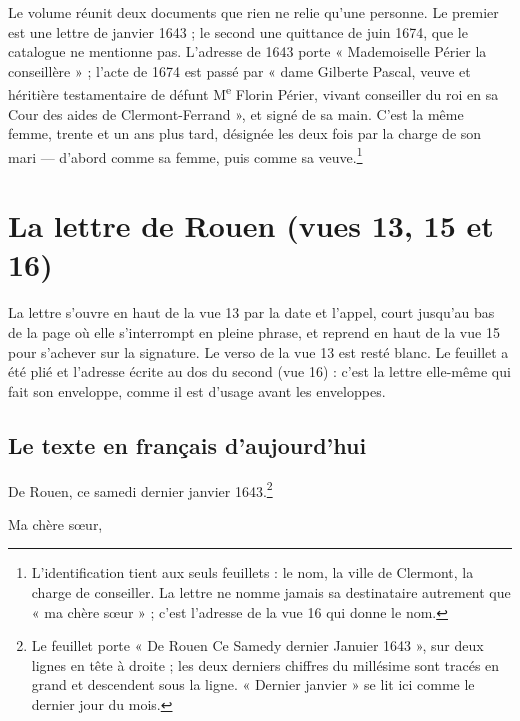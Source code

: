 \documentclass[11pt,a4paper]{article}
\begin{document}
Le volume réunit deux documents que rien ne relie qu'une personne. Le premier
est une lettre de janvier 1643 ; le second une quittance de juin 1674, que le
catalogue ne mentionne pas. L'adresse de 1643 porte « Mademoiselle Périer la
conseillère » ; l'acte de 1674 est passé par « dame Gilberte Pascal, veuve et
héritière testamentaire de défunt M\textsuperscript{e} Florin Périer, vivant
conseiller du roi en sa Cour des aides de Clermont-Ferrand », et signé de sa
main. C'est la même femme, trente et un ans plus tard, désignée les deux fois
par la charge de son mari — d'abord comme sa femme, puis comme sa
veuve.\footnote{L'identification tient aux seuls feuillets : le nom, la ville
de Clermont, la charge de conseiller. La lettre ne nomme jamais sa
destinataire autrement que « ma chère sœur » ; c'est l'adresse de la vue 16
qui donne le nom.}

\section*{La lettre de Rouen (vues 13, 15 et 16)}

La lettre s'ouvre en haut de la vue 13 par la date et l'appel, court jusqu'au
bas de la page où elle s'interrompt en pleine phrase, et reprend en haut de la
vue 15 pour s'achever sur la signature. Le verso de la vue 13 est resté blanc.
Le feuillet a été plié et l'adresse écrite au dos du second (vue 16) : c'est
la lettre elle-même qui fait son enveloppe, comme il est d'usage avant les
enveloppes.

\subsection*{Le texte en français d'aujourd'hui}

De Rouen, ce samedi dernier janvier 1643.\footnote{Le feuillet porte « De
Rouen Ce Samedy dernier Januier 1643 », sur deux lignes en tête à droite ;
les deux derniers chiffres du millésime sont tracés en grand et descendent
sous la ligne. « Dernier janvier » se lit ici comme le dernier jour du mois.}

Ma chère sœur,
\end{document}
